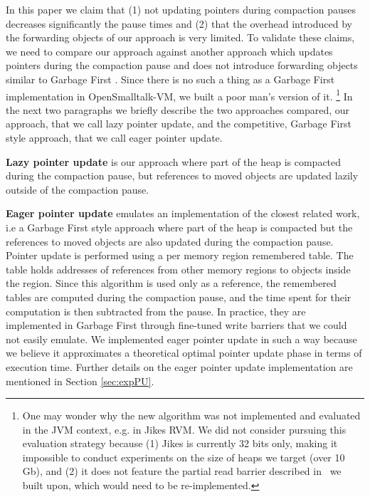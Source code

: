 \documentclass[sigplan,10pt,review,anonymous]{acmart}\settopmatter{printfolios=true,printccs=false,printacmref=false}
\def\OpenSmalltalkVM{OpenSmalltalk-VM\xspace}
\def\ie{\emph{i.e., }}
\begin{document}
In this paper we claim that (1) not updating pointers during compaction pauses decreases significantly the pause times and (2) that the overhead introduced by the forwarding objects of our approach is very limited. To validate these claims, we need to compare our approach against another approach which updates pointers during the compaction pause and does not introduce forwarding objects similar to Garbage First \cite{G1}. 
Since there is no such a thing as a Garbage First implementation in \OpenSmalltalkVM, we built a poor man's version of it. 
\footnote{One may wonder why the new algorithm was not implemented and evaluated in the JVM context, e.g. in Jikes RVM. We did not consider pursuing this evaluation strategy because (1) Jikes is currently 32 bits only, making it impossible to conduct experiments on the size of heaps we target (over 10 Gb), 
and (2) it does not feature the partial read barrier described in~\cite{Forwarders} we built upon, which would need to be re-implemented.}
In the next two paragraphs we briefly describe the two approaches compared, our approach, that we call lazy pointer update, and the competitive, Garbage First style approach, that we call eager pointer update.

\textbf{Lazy pointer update} is our approach where part of the heap is compacted during the compaction pause, but references to moved objects are updated lazily outside of the compaction pause. 

\textbf{Eager pointer update} emulates an implementation of the closest related work, i.e a Garbage First style approach where part of the heap is compacted but the references to moved objects are also updated during the compaction pause. Pointer update is performed using a per memory region remembered table. The table holds addresses of references from other memory regions to objects inside the region. Since this algorithm is used only as a reference, the remembered tables are computed during the compaction pause, and the time spent for their computation is then subtracted from the pause. In practice, they are implemented in Garbage First through fine-tuned write barriers that we could not easily emulate. We implemented eager pointer update in such a way because we believe it approximates a theoretical optimal pointer update phase in terms of execution time. %
Further details on the eager pointer update implementation are mentioned in Section \ref{sec:expPU}. 
\end{document}
